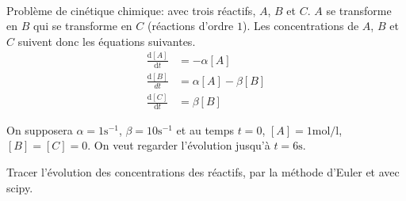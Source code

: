 \exer{[EQD-006]}
\setcounter{numques}{0}~\\

\question{}
 
 Problème de cinétique chimique: avec trois réactifs, $A$, $B$ et
$C$. $A$ se transforme en $B$ qui se transforme en $C$ (réactions d'ordre $1$). 
Les concentrations de $A$, $B$ et $C$ suivent donc les équations suivantes.
\begin{align*}
  \frac{\mathrm{d}[A]}{\mathrm{d}t}&=-\alpha[A]\\
\frac{\mathrm{d}[B]}{dt}&=\alpha[A]-\beta[B]\\
\frac{\mathrm{d}[C]}{\mathrm{d}t}&=\beta[B]
\end{align*}

On supposera $\alpha=1\text{s}^{-1}$, $\beta=10\text{s}^{-1}$ et au
temps $t=0$, $[A] = 1\text{mol}/\text{l}$, $[B]=[C]=0$. On veut
regarder l'évolution
jusqu'à $t=6\text{s}$.

\question{}
Tracer l'évolution des concentrations des réactifs, par la méthode d'Euler et avec scipy.